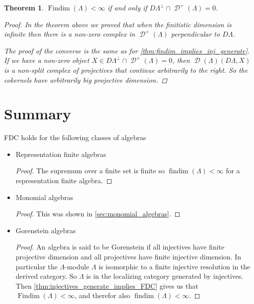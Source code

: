 \documentclass[11pt, a4paper, english]{article}
\newtheorem{theorem}{Theorem}[section]
\theoremstyle{definition}
\DeclareMathOperator{\findim}{findim}
\DeclareMathOperator{\Findim}{Findim}
\DeclareMathOperator{\D}{\mathcal{D}}
\begin{document}
\begin{theorem}\cite[Theorem~4.4]{Rick19}
	$\Findim(\Lambda) < \infty$ if and only if $D\Lambda^\perp \cap \D^+(\Lambda) = 0$.
	\begin{proof}
		In the theorem above we proved that when the finitistic dimension is infinite then there is a non-zero complex in $\D^+(\Lambda)$ perpendicular to $D\Lambda$. 
		
		The proof of the converse is the same as for \cref{thm:findim_implies_inj_generate}. If we have a non-zero object $X \in D\Lambda^\perp \cap \D^+(\Lambda) = 0$, then $\D(\Lambda)(D\Lambda, X)$ is a non-split complex of projectives that continue arbitrarily to the right. So the cokernels have arbitrarily big projective dimension.
	\end{proof}
\end{theorem}

\section{Summary}

FDC holds for the following classes of algebras

\begin{itemize}
	\item Representation finite algebras
	\begin{proof}
		The supremum over a finite set is finite so $\findim(\Lambda) < \infty$ for a representation finite algebra.
	\end{proof}
	\item Monomial algebras
	\begin{proof}
		This was shown in \cref{sec:monomial_algebras}.
	\end{proof}
	\item Gorenstein algebras
	\begin{proof}
		An algebra is said to be Gorenstein if all injectives have finite projective dimension and all projectives have finite injective dimension. In particular the $\Lambda$-module $\Lambda$ is isomorphic to a finite injective resolution in the derived category. So $\Lambda$ is in the localizing category generated by injectives. Then \cref{thm:injectives_generate_implies_FDC} gives us that $\Findim(\Lambda) < \infty$, and therefor also $\findim(\Lambda) < \infty$.
	\end{proof}
\end{itemize}
\end{document}
